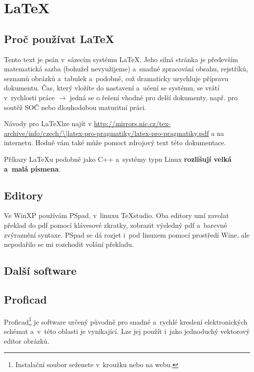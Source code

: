  
 
\section{\LaTeX} 

\subsection{Proč používat \LaTeX} 

Tento text je psán v~sázecím systému  \LaTeX . 
Jeho silná stránka je především matematická sazba 
(bohužel nevyužijeme) a~snadné zpracování obsahu, rejstříků, seznamů obrázků a~tabulek a~podobně, což dramaticky urychluje přípravu dokumentu. 
Čas, který vložíte do nastavení a~učení se systému, se vrátí v~rychlosti práce
 $\rightarrow$ jedná se o řešení vhodné pro delší dokumenty, např. pro soutěž SOČ nebo dlouhodobou maturitní práci. 
 
Návody pro \LaTeX lze najít v 
\url{http://mirrors.nic.cz/tex-archive/info/czech/\|latex-pro-pragmatiky/latex-pro-pragmatiky.pdf} %
\emergencystretch=2cm a na internetu.
Hodně vám také může pomoct zdrojový text této dokumentace. 

Příkazy \LaTeX{}u podobně jako C++ a~systémy typu Linux {\bf rozlišují velká a~malá písmena}. 
 

\subsection{Editory}

Ve WinXP používám PSpad, v~linuxu TeXstudio. 
Oba editory umí zavolat překlad do pdf pomocí klávesové zkratky, zobrazit výsledný pdf a~barevné zvýraznění syntaxe. 
PSpad se dá rozjet i~pod linuxem pomocí prostředí Wine, ale nepodařilo se mi rozchodit volání překladu. 

 
\subsection{Další software}

\subsection{Proficad}

Proficad\footnote{Instalační soubor seženete v~kroužku nebo na webu.} 
je software určený původně pro snadné a~rychlé kreslení elektronických schémat a~v~této oblasti je vynikající. 
Lze jej použít i~jako jednoduchý vektorový editor obrázků. 

